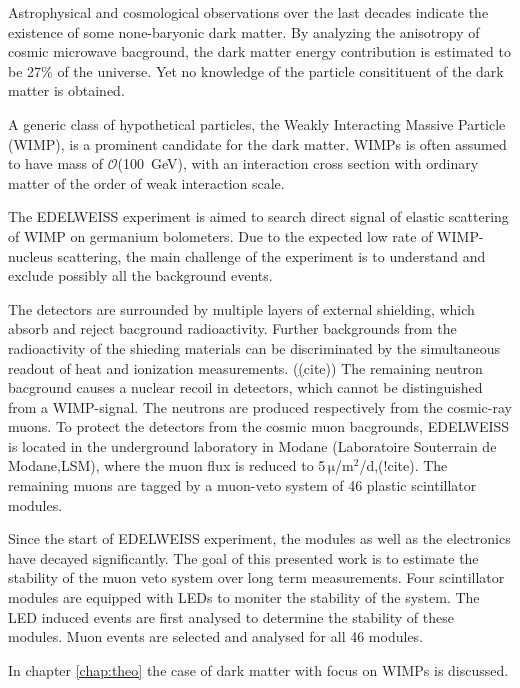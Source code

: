 Astrophysical and cosmological observations over the last decades indicate the existence of some none-baryonic dark matter. By analyzing the anisotropy of cosmic microwave bacground, the dark matter energy contribution is estimated to be 27\% of the universe. Yet no knowledge of the particle consitituent of the dark matter is obtained.

A generic class of hypothetical particles, the Weakly Interacting Massive Particle (WIMP), is a prominent candidate for the dark matter. WIMPs is often assumed to have mass of $\mathcal{O}$(\SI{100}{GeV}), with an interaction cross section with ordinary matter of the order of weak interaction scale.

The EDELWEISS experiment is aimed to search direct signal of elastic scattering of WIMP on germanium bolometers. Due to the expected low rate of WIMP-nucleus scattering, the main challenge of the experiment is to understand and exclude possibly all the background events.

The detectors are surrounded by multiple layers of external shielding, which absorb and reject bacground radioactivity. Further backgrounds from the radioactivity of the shieding materials can be discriminated by the simultaneous readout of heat and ionization measurements. (\underline(cite))  The remaining neutron bacground causes a nuclear recoil in detectors, which cannot be distinguished from a WIMP-signal. The neutrons are produced respectively from the cosmic-ray muons. To protect the detectors from the cosmic muon bacgrounds, EDELWEISS is located in the underground laboratory in Modane (Laboratoire Souterrain de Modane,LSM), where the muon flux is reduced to 5\,$\mathrm{\mu}$/$\mathrm{m}^{2}$/d,(!cite). The remaining muons are tagged by a muon-veto system of 46 plastic scintillator modules.

Since the start of EDELWEISS experiment, the modules as well as the electronics have decayed significantly. The goal of this presented work is to estimate the stability of the muon veto system over long term measurements. Four scintillator modules are equipped with LEDs to moniter the stability of the system. The LED induced events are first analysed to determine the stability of these modules. Muon events are selected and analysed for all 46 modules.

In chapter \ref{chap:theo} the case of dark matter with focus on WIMPs is discussed.
